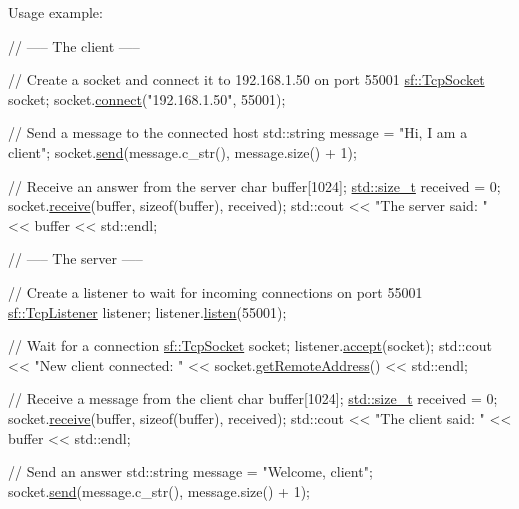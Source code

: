Usage example\-: 
\begin{DoxyCode}
\textcolor{comment}{// ----- The client -----}

\textcolor{comment}{// Create a socket and connect it to 192.168.1.50 on port 55001}
\hyperlink{classsf_1_1_tcp_socket}{sf::TcpSocket} socket;
socket.\hyperlink{classsf_1_1_tcp_socket_a68cd42d5ab70ab54b16787f555951c40}{connect}(\textcolor{stringliteral}{"192.168.1.50"}, 55001);

\textcolor{comment}{// Send a message to the connected host}
std::string message = \textcolor{stringliteral}{"Hi, I am a client"};
socket.\hyperlink{classsf_1_1_tcp_socket_affce26ab3bcc4f5b9269dad79db544c0}{send}(message.c\_str(), message.size() + 1);

\textcolor{comment}{// Receive an answer from the server}
\textcolor{keywordtype}{char} buffer[1024];
\hyperlink{curses_8priv_8h_ae43e1afb4123c6ddee091cf03ec10266}{std::size\_t} received = 0;
socket.\hyperlink{classsf_1_1_tcp_socket_a90ce50811ea61d4f00efc62bb99ae1af}{receive}(buffer, \textcolor{keyword}{sizeof}(buffer), received);
std::cout << \textcolor{stringliteral}{"The server said: "} << buffer << std::endl;

\textcolor{comment}{// ----- The server -----}

\textcolor{comment}{// Create a listener to wait for incoming connections on port 55001}
\hyperlink{classsf_1_1_tcp_listener}{sf::TcpListener} listener;
listener.\hyperlink{classsf_1_1_tcp_listener_a409d9350d3abfea9636df8cf4a61004e}{listen}(55001);

\textcolor{comment}{// Wait for a connection}
\hyperlink{classsf_1_1_tcp_socket}{sf::TcpSocket} socket;
listener.\hyperlink{classsf_1_1_tcp_listener_ae2c83ce5a64d50b68180c46bef0a7346}{accept}(socket);
std::cout << \textcolor{stringliteral}{"New client connected: "} << socket.\hyperlink{classsf_1_1_tcp_socket_a7904ca6ab9e018021e305a3aeb7a1b9a}{getRemoteAddress}() << std::endl;

\textcolor{comment}{// Receive a message from the client}
\textcolor{keywordtype}{char} buffer[1024];
\hyperlink{curses_8priv_8h_ae43e1afb4123c6ddee091cf03ec10266}{std::size\_t} received = 0;
socket.\hyperlink{classsf_1_1_tcp_socket_a90ce50811ea61d4f00efc62bb99ae1af}{receive}(buffer, \textcolor{keyword}{sizeof}(buffer), received);
std::cout << \textcolor{stringliteral}{"The client said: "} << buffer << std::endl;

\textcolor{comment}{// Send an answer}
std::string message = \textcolor{stringliteral}{"Welcome, client"};
socket.\hyperlink{classsf_1_1_tcp_socket_affce26ab3bcc4f5b9269dad79db544c0}{send}(message.c\_str(), message.size() + 1);
\end{DoxyCode}



